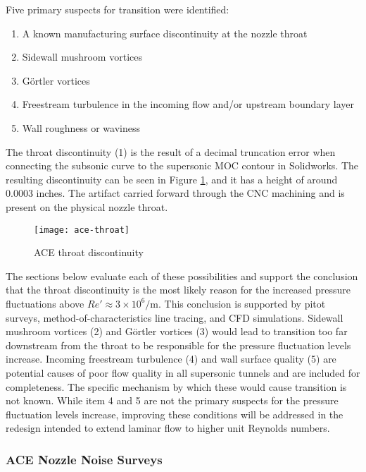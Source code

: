 Five primary suspects for transition were identified:

\begin{enumerate}
    \item A known manufacturing surface discontinuity at the nozzle throat
    \item Sidewall mushroom vortices
    \item Görtler vortices
    \item Freestream turbulence in the incoming flow and/or upstream boundary layer
    \item Wall roughness or waviness
\end{enumerate}

The throat discontinuity (1) is the result of a decimal truncation error when connecting the subsonic curve to the supersonic MOC contour in Solidworks. The resulting discontinuity can be seen in Figure \ref{fig:ace-throat}, and it has a height of around 0.0003 inches. The artifact carried forward through the CNC machining and is present on the physical nozzle throat.

\begin{figure}[ht!]
    \centering
    \texttt{[image: ace-throat]}
    \caption{ACE throat discontinuity}
    \label{fig:ace-throat}
\end{figure}


The sections below evaluate each of these possibilities and support the conclusion that the throat discontinuity is the most likely reason for the increased pressure fluctuations above $Re' \approx 3 \times 10^6/\mathrm{m}$. This conclusion is supported by pitot surveys, method-of-characteristics line tracing, and CFD simulations. Sidewall mushroom vortices (2) and Görtler vortices (3) would lead to transition too far downstream from the throat to be responsible for the pressure fluctuation levels increase. Incoming freestream turbulence (4) and wall surface quality (5) are potential causes of poor flow quality in all supersonic tunnels and are included for completeness. The specific mechanism by which these would cause transition is not known. While item 4 and 5 are not the primary suspects for the pressure fluctuation levels increase, improving these conditions will be addressed in the redesign intended to extend laminar flow to higher unit Reynolds numbers.

\subsubsection*{ACE Nozzle Noise Surveys}

